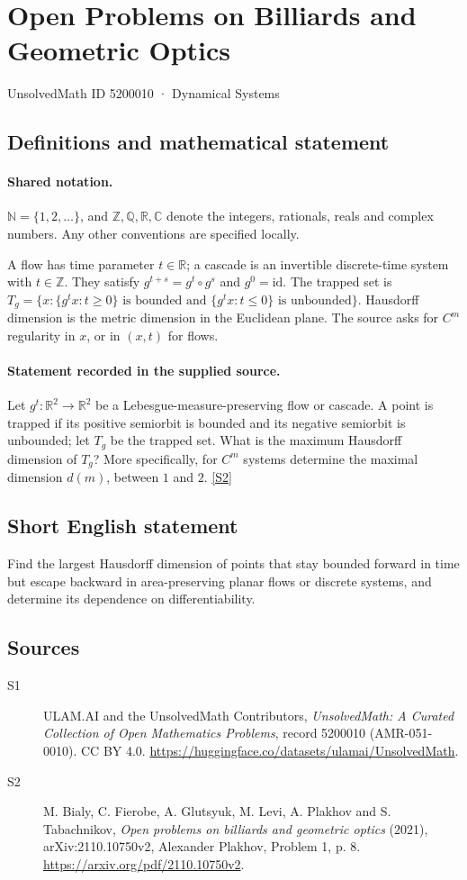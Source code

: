 \documentclass[11pt]{article}
\newcommand{\sref}[2]{\hyperlink{source:#1:#2}{[S#2]}}
\begin{document}
\setcounter{section}{5200009}
\section{Open Problems on Billiards and Geometric Optics}\label{5200010}
{\small\sffamily UnsolvedMath ID 5200010 · Dynamical Systems}
\subsection{Definitions and mathematical statement}

\paragraph{Shared notation.}$\mathbb N=\{1,2,\ldots\}$, and $\mathbb Z,\mathbb Q,\mathbb R,\mathbb C$ denote the integers, rationals, reals and complex numbers. Any other conventions are specified locally.


A flow has time parameter $t\in\mathbb R$; a cascade is an invertible discrete-time system with $t\in\mathbb Z$. They satisfy $g^{t+s}=g^t\circ g^s$ and $g^0=\mathrm{id}$. The trapped set is $T_g=\{x:\{g^t x:t\ge0\}\text{ is bounded and }\{g^t x:t\le0\}\text{ is unbounded}\}$. Hausdorff dimension is the metric dimension in the Euclidean plane. The source asks for $C^m$ regularity in $x$, or in $(x,t)$ for flows.
\paragraph{Statement recorded in the supplied source.}
Let $g^t:\mathbb{R}^2\to\mathbb{R}^2$ be a Lebesgue-measure-preserving flow or cascade. A point is trapped if its positive semiorbit is bounded and its negative semiorbit is unbounded; let $T_g$ be the trapped set. What is the maximum Hausdorff dimension of $T_g$? More specifically, for $C^m$ systems determine the maximal dimension $d(m)$, between $1$ and $2$. \sref{5200010}{2}
\subsection{Short English statement}
Find the largest Hausdorff dimension of points that stay bounded forward in time but escape backward in area-preserving planar flows or discrete systems, and determine its dependence on differentiability.
\subsection{Sources}
\begin{description}
\item[\hypertarget{source:5200010:1}{S1}] ULAM.AI and the UnsolvedMath Contributors, \emph{UnsolvedMath: A Curated Collection of Open Mathematics Problems}, record 5200010 (AMR-051-0010). CC BY 4.0. \url{https://huggingface.co/datasets/ulamai/UnsolvedMath}.
\item[\hypertarget{source:5200010:2}{S2}] M. Bialy, C. Fierobe, A. Glutsyuk, M. Levi, A. Plakhov and S. Tabachnikov, \emph{Open problems on billiards and geometric optics} (2021), arXiv:2110.10750v2, Alexander Plakhov, Problem 1, p. 8. \url{https://arxiv.org/pdf/2110.10750v2}.
\end{description}
\label{end:5200010}
\end{document}
